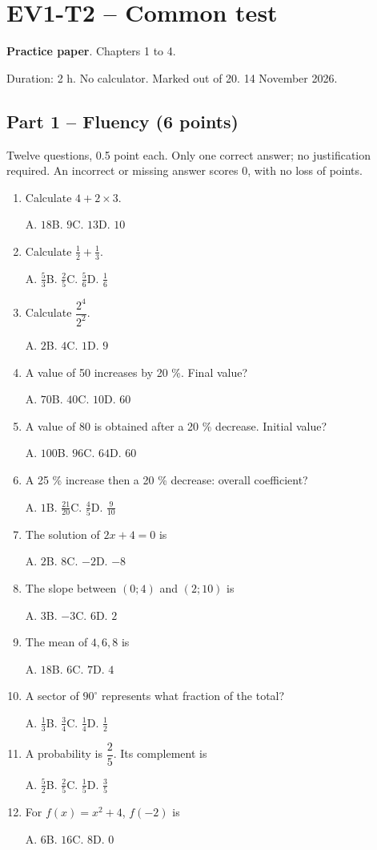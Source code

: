 \mxnewpage\section*{EV1-T2 -- Common test}\label{EV1-T2}
\textbf{Practice paper}. Chapters 1 to 4.\par Duration: 2 h. No calculator. Marked out of 20. 14 November 2026.
\subsection*{Part 1 -- Fluency (6 points)}
Twelve questions, 0.5 point each. Only one correct answer; no justification required. An incorrect or missing answer scores 0, with no loss of points.
\begin{enumerate}
\item Calculate $4+2\times3$.\par A. $18$\quad B. $9$\quad C. $13$\quad D. $10$
\item Calculate $\frac12+\frac13$.\par A. $\frac{5}{3}$\quad B. $\frac{2}{5}$\quad C. $\frac{5}{6}$\quad D. $\frac{1}{6}$
\item Calculate $\dfrac{2^4}{2^{2}}$.\par A. $2$\quad B. $4$\quad C. $1$\quad D. $9$
\item A value of 50 increases by 20 \%. Final value?\par A. $70$\quad B. $40$\quad C. $10$\quad D. $60$
\item A value of 80 is obtained after a 20 \% decrease. Initial value?\par A. $100$\quad B. $96$\quad C. $64$\quad D. $60$
\item A 25 \% increase then a 20 \% decrease: overall coefficient?\par A. $1$\quad B. $\frac{21}{20}$\quad C. $\frac{4}{5}$\quad D. $\frac{9}{10}$
\item The solution of $2x+4=0$ is\par A. $2$\quad B. $8$\quad C. $-2$\quad D. $-8$
\item The slope between $(0;4)$ and $(2;10)$ is\par A. $3$\quad B. $-3$\quad C. $6$\quad D. $2$
\item The mean of $4, 6, 8$ is\par A. $18$\quad B. $6$\quad C. $7$\quad D. $4$
\item A sector of $90^\circ$ represents what fraction of the total?\par A. $\frac{1}{3}$\quad B. $\frac{3}{4}$\quad C. $\frac{1}{4}$\quad D. $\frac{1}{2}$
\item A probability is $\dfrac{2}{5}$. Its complement is\par A. $\frac{5}{2}$\quad B. $\frac{2}{5}$\quad C. $\frac{1}{5}$\quad D. $\frac{3}{5}$
\item For $f(x)=x^2+4$, $f(-2)$ is\par A. $6$\quad B. $16$\quad C. $8$\quad D. $0$
\end{enumerate}
